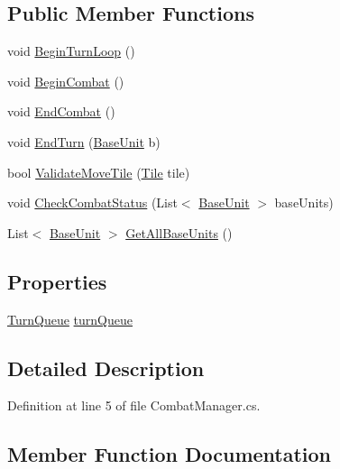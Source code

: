 \subsection*{Public Member Functions}
\begin{DoxyCompactItemize}
\item 
void \mbox{\hyperlink{class_combat_manager_aa31394843beacdbfd52d683a68a7f454}{Begin\+Turn\+Loop}} ()
\item 
void \mbox{\hyperlink{class_combat_manager_ab5d0c356fd55e86d62b03c015754abee}{Begin\+Combat}} ()
\item 
void \mbox{\hyperlink{class_combat_manager_a8d14cf9a8265e20264151a615e309f12}{End\+Combat}} ()
\item 
void \mbox{\hyperlink{class_combat_manager_ae306deb3898e096bf5ad6cdd705b82fa}{End\+Turn}} (\mbox{\hyperlink{class_base_unit}{Base\+Unit}} b)
\item 
bool \mbox{\hyperlink{class_combat_manager_a6f648795292255b600e92eefcf960ded}{Validate\+Move\+Tile}} (\mbox{\hyperlink{class_tile}{Tile}} tile)
\item 
void \mbox{\hyperlink{class_combat_manager_aea6dfda807c4ec793ed26c5d220b84fb}{Check\+Combat\+Status}} (List$<$ \mbox{\hyperlink{class_base_unit}{Base\+Unit}} $>$ base\+Units)
\item 
List$<$ \mbox{\hyperlink{class_base_unit}{Base\+Unit}} $>$ \mbox{\hyperlink{class_combat_manager_a02eb44e3f4fab4f210d4ecda54fa1272}{Get\+All\+Base\+Units}} ()
\end{DoxyCompactItemize}
\subsection*{Properties}
\begin{DoxyCompactItemize}
\item 
\mbox{\hyperlink{class_turn_queue}{Turn\+Queue}} \mbox{\hyperlink{class_combat_manager_a6316ac49fbaf2e16426313d12749761d}{turn\+Queue}}
\end{DoxyCompactItemize}


\subsection{Detailed Description}


Definition at line 5 of file Combat\+Manager.\+cs.



\subsection{Member Function Documentation}
\mbox{\label{class_combat_manager_ab5d0c356fd55e86d62b03c015754abee}} 
